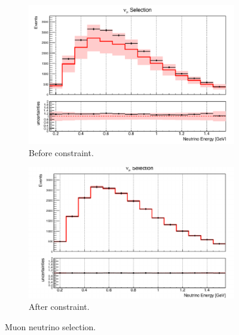 \begin{figure}[H] 
\begin{center}
    \begin{subfigure}[b]{0.45\textwidth}
    \centering
    \includegraphics[width=1.00\textwidth]{Fakedata/set2/numu_before_constrain.pdf}
    \caption{\label{fig:fakedata:set2:numu_before_constrain} Before constraint.}
    \end{subfigure}
    \begin{subfigure}[b]{0.45\textwidth}
    \centering
    \includegraphics[width=1.00\textwidth]{Fakedata/set2/numu_after_constrain.pdf}
    \caption{\label{fig:fakedata:set2:numu_after_constrain} After constraint.}
    \end{subfigure}
\caption{\label{fig:fakedata:set2:numu_const} Muon neutrino selection.}
\end{center}
\end{figure}


